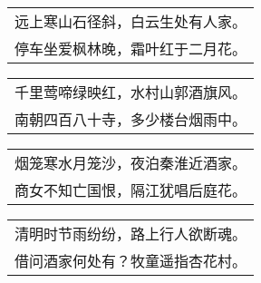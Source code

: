 \nopagebreak%
\nopagebreak%
\noindent\begin{minipage}{\linewidth}
  \vskip-3pt\begin{table}[H]
    \centering
    \begin{tabular}{@{}l@{}}
远上寒山石径斜，白云生处有人家。\\
停车坐爱枫林晚，霜叶红于二月花。
    \end{tabular}
  \end{table}
\end{minipage}
\vspace{1cm}


\nopagebreak%
\nopagebreak%
\noindent\begin{minipage}{\linewidth}
  \vskip-3pt\begin{table}[H]
    \centering
    \begin{tabular}{@{}l@{}}
千里莺啼绿映红，水村山郭酒旗风。\\
南朝四百八十寺，多少楼台烟雨中。
    \end{tabular}
  \end{table}
\end{minipage}
\vspace{1cm}


\nopagebreak%
\nopagebreak%
\noindent\begin{minipage}{\linewidth}
  \vskip-3pt\begin{table}[H]
    \centering
    \begin{tabular}{@{}l@{}}
烟笼寒水月笼沙，夜泊秦淮近酒家。\\
商女不知亡国恨，隔江犹唱后庭花。
    \end{tabular}
  \end{table}
\end{minipage}
\vspace{1cm}


\nopagebreak%
\nopagebreak%
\noindent\begin{minipage}{\linewidth}
  \vskip-3pt\begin{table}[H]
    \centering
    \begin{tabular}{@{}l@{}}
清明时节雨纷纷，路上行人欲断魂。\\
借问酒家何处有？牧童遥指杏花村。
    \end{tabular}
  \end{table}
\end{minipage}
\vspace{1cm}


